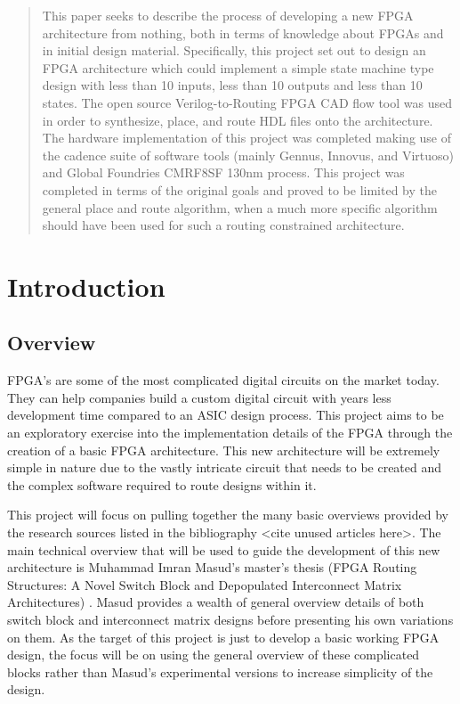 \documentclass[12pt]{article}
\begin{document}
\begin{abstract}
This paper seeks to describe the process of developing a new FPGA architecture from 
nothing, both in terms of knowledge about FPGAs and in initial design material. Specifically,
 this project set out to design an FPGA architecture which could implement a simple 
state machine type design with less than 10 inputs, less than 10 outputs and less 
than 10 states. The open source Verilog-to-Routing FPGA CAD flow tool was used in order to
synthesize, place, and route HDL files onto the architecture. The hardware implementation of this project was completed
making use of the cadence suite of software tools (mainly Gennus, Innovus, and Virtuoso)
and Global Foundries CMRF8SF 130nm process.
This project was completed in terms of the original goals and proved to be limited by
the general place and route algorithm, when a much more specific algorithm should have been
used for such a routing constrained architecture.

\end{abstract}
\newpage

\tableofcontents
\newpage
\listoffigures
\newpage

\section{Introduction}

\subsection{Overview}

FPGA’s are some of the most complicated digital circuits on the market today. They 
can help companies build a custom digital circuit with years less development time 
compared to an ASIC design process. This project aims to be an exploratory exercise
into the implementation details of the FPGA through the creation 
of a basic FPGA architecture. This new architecture will be extremely simple in nature 
due to the vastly intricate circuit that needs to be created and the complex software 
required to route designs within it.

This project will focus on pulling together the many basic overviews provided by 
the research sources listed in the bibliography <cite unused articles here>. The main technical overview that will 
be used to guide the development of this new architecture is Muhammad Imran Masud’s
master's thesis (FPGA Routing Structures: A Novel Switch Block and Depopulated 
Interconnect Matrix Architectures) \cite{masud_1999}. Masud provides a wealth of general overview details 
of both switch block and interconnect matrix designs before presenting his own variations 
on them. As the target of this project is just to develop a basic working FPGA design,
the focus will be on using the general overview of these complicated blocks rather 
than Masud’s experimental versions to increase simplicity of the design.
\end{document}
